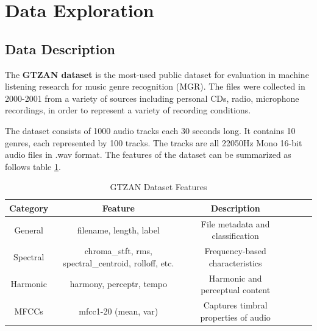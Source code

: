 \documentclass[11.5pt]{article}
\begin{document}
\section{Data Exploration} \label{sec:data_exploration}
\subsection{Data Description}
The \textbf{GTZAN dataset} is the most-used public dataset for evaluation in machine listening research for music genre recognition (MGR). The files were collected in 2000-2001 from a variety of sources including personal CDs, radio, microphone recordings, in order to represent a variety of recording conditions.\cite{GTZANDatasetMusic}

The dataset consists of 1000 audio tracks each 30 seconds long. It contains 10 genres, each represented by 100 tracks. The tracks are all 22050Hz Mono 16-bit audio files in .wav format. The features of the dataset can be summarized as follows table \ref{tab:dataset}.
\begin{table}[h]
    \centering
    \begin{tabular}{cccccc}
        \toprule
        \textbf{Category} & \textbf{Feature}                                     & \textbf{Description}                 \\
        \midrule
        General           & filename, length, label                              & File metadata and classification     \\
        Spectral          & chroma\_stft, rms, spectral\_centroid, rolloff, etc. & Frequency-based characteristics      \\
        Harmonic          & harmony, perceptr, tempo                             & Harmonic and perceptual content      \\

        MFCCs             & mfcc1-20 (mean, var)                                 & Captures timbral properties of audio \\

        \bottomrule
    \end{tabular}
    \caption{GTZAN Dataset Features}
    \label{tab:dataset}
\end{table}
\end{document}
